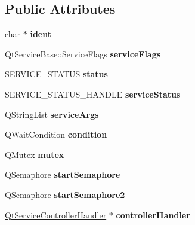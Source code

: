\subsection*{Public Attributes}
\begin{DoxyCompactItemize}
\item 
\mbox{\label{class_qt_service_sys_private_a5b718dc890ba28a1a8ecc2c292ed3683}} 
char $\ast$ {\bfseries ident}
\item 
\mbox{\label{class_qt_service_sys_private_ab3a1a34e95b1028d2d2437ce5683ce25}} 
Qt\+Service\+Base\+::\+Service\+Flags {\bfseries service\+Flags}
\item 
\mbox{\label{class_qt_service_sys_private_a4eaa8c9fb344d5fcbe52e13d9b563749}} 
S\+E\+R\+V\+I\+C\+E\+\_\+\+S\+T\+A\+T\+US {\bfseries status}
\item 
\mbox{\label{class_qt_service_sys_private_a5794a5ac189b478c944426805b41ae2c}} 
S\+E\+R\+V\+I\+C\+E\+\_\+\+S\+T\+A\+T\+U\+S\+\_\+\+H\+A\+N\+D\+LE {\bfseries service\+Status}
\item 
\mbox{\label{class_qt_service_sys_private_aece0e34030f5abf3ec7bee64b4ab22a3}} 
Q\+String\+List {\bfseries service\+Args}
\item 
\mbox{\label{class_qt_service_sys_private_a8fc09bc3f805b5afe18e5d2a5d42f466}} 
Q\+Wait\+Condition {\bfseries condition}
\item 
\mbox{\label{class_qt_service_sys_private_a13840c7d50506cea8ac099d75ed5bd94}} 
Q\+Mutex {\bfseries mutex}
\item 
\mbox{\label{class_qt_service_sys_private_a2b96b9ff0db26655accab99d6527fe3d}} 
Q\+Semaphore {\bfseries start\+Semaphore}
\item 
\mbox{\label{class_qt_service_sys_private_ab81c4cc12732b32d6962253868fde059}} 
Q\+Semaphore {\bfseries start\+Semaphore2}
\item 
\mbox{\label{class_qt_service_sys_private_ac8834f0ad3dd97b1dfb9e7de563ee5cb}} 
\hyperlink{class_qt_service_controller_handler}{Qt\+Service\+Controller\+Handler} $\ast$ {\bfseries controller\+Handler}
\end{DoxyCompactItemize}

